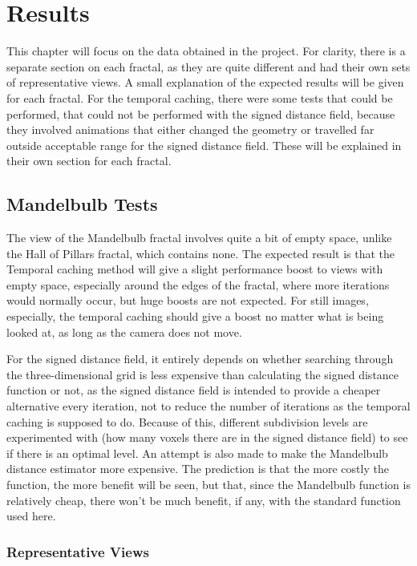 \chapter{Results}
\label{chapter4}

This chapter will focus on the data obtained in the project. For clarity, there is a separate section on each fractal, as they are quite different and had their own sets of representative views. A small explanation of the expected results will be given for each fractal. For the temporal caching, there were some tests that could be performed, that could not be performed with the signed distance field, because they involved animations that either changed the geometry or travelled far outside acceptable range for the signed distance field. These will be explained in their own section for each fractal.

\section{Mandelbulb Tests}

The view of the Mandelbulb fractal involves quite a bit of empty space, unlike the Hall of Pillars fractal, which contains none. The expected result is that the Temporal caching method will give a slight performance boost to views with empty space, especially around the edges of the fractal, where more iterations would normally occur, but huge boosts are not expected. For still images, especially, the temporal caching should give a boost no matter what is being looked at, as long as the camera does not move.\newline

For the signed distance field, it entirely depends on whether searching through the three-dimensional grid is less expensive than calculating the signed distance function or not, as the signed distance field is intended to provide a cheaper alternative every iteration, not to reduce the number of iterations as the temporal caching is supposed to do. Because of this, different subdivision levels are experimented with (how many voxels there are in the signed distance field) to see if there is an optimal level. An attempt is also made to make the Mandelbulb distance estimator more expensive. The prediction is that the more costly the function, the more benefit will be seen, but that, since the Mandelbulb function is relatively cheap, there won't be much benefit, if any, with the standard function used here.

\subsection{Representative Views}

